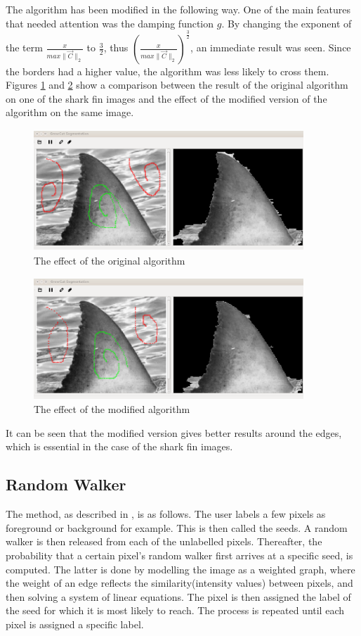 \documentclass[a4paper,10pt]{article}
\begin{document}
\noindent The algorithm has been modified in the following way.  One of the
main features that needed attention was the damping function $g$.  By changing
the exponent of the term $\frac{x}{max\| \overrightarrow{C} \|_{2}}$ to
$\frac{3}{2}$, thus $\left ({\frac{x}{max\| \overrightarrow{C} \|_{2}}}\right
) ^\frac{3}{2}$,
an immediate result was seen.  Since the borders
  had a higher value, the algorithm was less likely to cross them. \\  
 
Figures \ref{fin1} and \ref{fin2} show a comparison between the result of the original algorithm on
one of the shark fin images and the effect of the modified version of the
algorithm on the same image.
\begin{figure}[H]
 \centering
 \includegraphics[width=4in, height=1.8in]{haaio}
 \caption{The effect of the original algorithm}
 \label{fin1}
\end{figure}

\begin{figure}[H]
 \centering
 \includegraphics[width=4in, height=1.8in]{haaim}
 \caption{The effect of the modified algorithm}
 \label{fin2}
\end{figure}

\noindent It can be seen that the modified version gives better results around
the edges, which is essential in the case of the shark fin images. \\  


\subsection{Random Walker}
The method, as
described in \cite{rw}, is as follows.  The user labels a few
pixels as foreground or background for example.  This is then called the seeds. 
A random walker is then released from each of the unlabelled pixels. 
Thereafter, the probability that a certain pixel's random walker first arrives
at a specific seed, is computed.  The latter is done by modelling the image as a weighted graph, where
the weight of an edge reflects the similarity(intensity values) between pixels,
and then solving a system of linear equations.  The pixel is then assigned the
label
of the seed for which it is most likely to reach.  The process is repeated until
each pixel is assigned a specific label.
\end{document}
